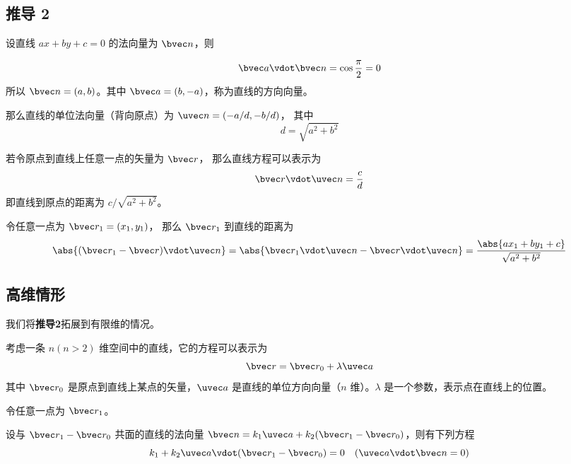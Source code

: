 \subsection{推导 2}

设直线 $ax + by + c = 0$ 的法向量为 $\bvec n$，则

\begin{equation}
\bvec a \vdot \bvec n = \cos \frac{\pi}{2} = 0
\end{equation}
所以 $\bvec n=(a,b)$。其中 $\bvec a=(b,-a)$，称为直线的方向向量。

那么直线的单位法向量（背向原点）为 $\uvec n = (-a/d, -b/d)$， 其中
\begin{equation}
d = \sqrt{a^2 + b^2}
\end{equation}

若令原点到直线上任意一点的矢量为 $\bvec r$， 那么直线方程可以表示为
\begin{equation}
\bvec r \vdot \uvec n = \frac{c}{d}
\end{equation}
即直线到原点的距离为 $c/\sqrt{a^2 + b^2}$。

令任意一点为 $\bvec r_1 = (x_1, y_1)$， 那么 $\bvec r_1$ 到直线的距离为
\begin{equation}
\abs{(\bvec r_1 - \bvec r)\vdot \uvec n} = \abs{\bvec r_1\vdot \uvec n - \bvec r \vdot \uvec n}
= \frac{\abs{ax_1 + by_1 + c}}{\sqrt{a^2 + b^2}}
\end{equation}


 






\subsection{高维情形}


我们将\textbf{推导2}拓展到有限维的情况。

考虑一条 $n(n>2)$ 维空间中的直线，它的方程可以表示为
\begin{equation}
\bvec r = \bvec r_0 + \lambda\uvec a
\end{equation}
其中 $\bvec r_0$ 是原点到直线上某点的矢量，$\uvec a$ 是直线的单位方向向量（$n$ 维）。$\lambda$ 是一个参数，表示点在直线上的位置。

令任意一点为 $\bvec r_1$。

设与 $\bvec r_1 - \bvec r_0$ 共面的直线的法向量 $\bvec n=k_1 \uvec a + k_2 (\bvec r_1 - \bvec r_0)$，则有下列方程
\begin{equation}
k_1 + k_2 \uvec a \vdot (\bvec r_1 - \bvec r_0) = 0 \quad (\uvec a \vdot \bvec n = 0)
\end{equation}

